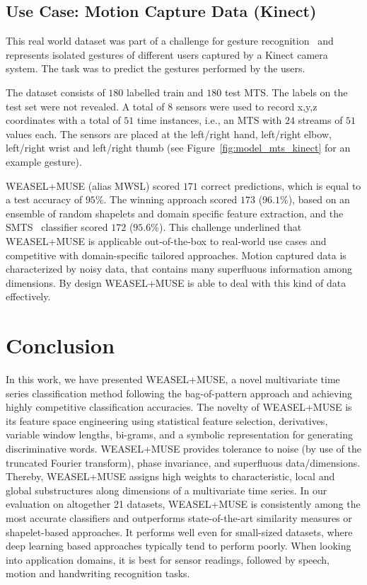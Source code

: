 \documentclass[sigconf]{acmart}
\begin{document}
 
\subsection{Use Case: Motion Capture Data (Kinect)}\label{subsec:usecase}

This real world dataset was part of a challenge for gesture recognition~\cite{AALTD_CHALLENGE_16} and represents isolated gestures of different users captured by a Kinect camera system. The task was to predict the gestures performed by the users. 

The dataset consists of $180$ labelled train and $180$ test MTS. The labels on the test set were not revealed. A total of $8$ sensors were used to record x,y,z coordinates with a total of $51$ time instances, i.e., an MTS with $24$ streams of $51$ values each. The sensors are placed at the left/right hand, left/right elbow, left/right wrist and left/right thumb (see Figure~\ref{fig:model_mts_kinect} for an example gesture). 

WEASEL+MUSE (alias MWSL) scored $171$ correct predictions, which is equal to a test accuracy of $95\%$. The winning approach scored $173$ ($96.1\%$), based on an ensemble of random shapelets and domain specific feature extraction, and the SMTS~\cite{baydogan2015learning} classifier scored $172$ ($95.6\%$). 
This challenge underlined that WEASEL+MUSE is applicable out-of-the-box to real-world use cases and competitive with domain-specific tailored approaches.
Motion captured data is characterized by noisy data, that contains many superfluous information among dimensions. By design WEASEL+MUSE is able to deal with this kind of data effectively.

\section{Conclusion}

In this work, we have presented WEASEL+MUSE, a novel multivariate time series classification method following the bag-of-pattern approach and achieving highly competitive classification accuracies. The novelty of WEASEL+MUSE is its feature space engineering using statistical feature selection, derivatives, variable window lengths, bi-grams, and a symbolic representation for generating discriminative words. WEASEL+MUSE provides tolerance to noise (by use of the truncated Fourier transform), phase invariance, and superfluous data/dimensions. Thereby, WEASEL+MUSE assigns high weights to characteristic, local and global substructures along dimensions of a multivariate time series. In our evaluation on altogether 21 datasets, WEASEL+MUSE is consistently among the most accurate classifiers and outperforms state-of-the-art similarity measures or shapelet-based approaches. It performs well even for small-sized  datasets, where deep learning based approaches typically tend to perform poorly. When looking into application domains, it is best for sensor readings, followed by speech, motion and handwriting recognition tasks.
\end{document}
